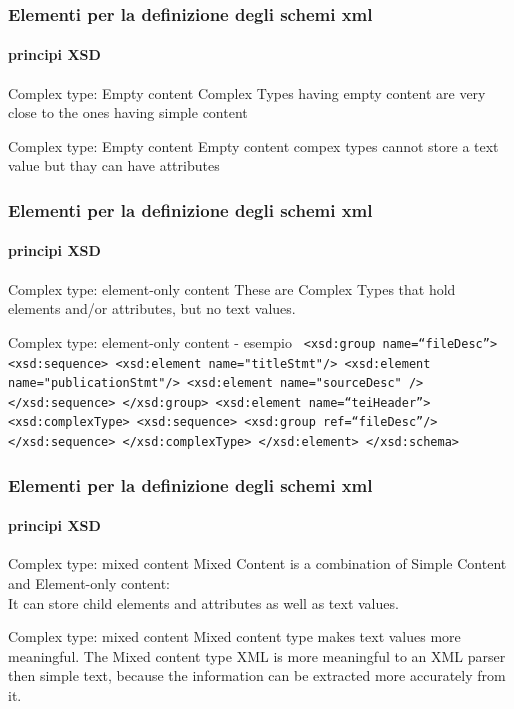 \begin{frame}
	\frametitle{Elementi per la definizione degli schemi xml}
	\framesubtitle{principi XSD}
	\addtocounter{nframe}{1}

	\begin{block}{Complex type: Empty content}
		Complex Types having empty content are very close to the ones having simple content
	\end{block}

	\begin{block}{Complex type: Empty content}
		Empty content compex types cannot store a text value but thay can have attributes
	\end{block}
\end{frame}



\begin{frame}
	\frametitle{Elementi per la definizione degli schemi xml}
	\framesubtitle{principi XSD}
	\addtocounter{nframe}{1}

	\begin{block}{Complex type: element-only content}
		These are Complex Types that hold elements and/or attributes, but no text values.
	\end{block}

	\begin{block}{Complex type: element-only content - esempio}
		\texttt{
			<xsd:group name=``fileDesc''>
			<xsd:sequence>
			<xsd:element name="titleStmt"/>
			<xsd:element name="publicationStmt"/>
			<xsd:element name="sourceDesc" />
			</xsd:sequence>
			</xsd:group>
			<xsd:element name=``teiHeader''>
			<xsd:complexType>
			<xsd:sequence>
			<xsd:group ref=``fileDesc''/>
			</xsd:sequence>
			</xsd:complexType>
			</xsd:element>
			</xsd:schema>
		}
	\end{block}
\end{frame}

\begin{frame}
	\frametitle{Elementi per la definizione degli schemi xml}
	\framesubtitle{principi XSD}
	\addtocounter{nframe}{1}

	\begin{block}{Complex type: mixed content}
		Mixed Content is a combination of Simple Content and Element-only content:
		\\ It can store child elements and attributes as well as text values.
	\end{block}

	\begin{block}{Complex type: mixed content}
		Mixed content type makes text values more meaningful. The Mixed content type XML is more meaningful to an XML parser then simple text, because the information can be extracted more accurately from it.
	\end{block}
\end{frame}

